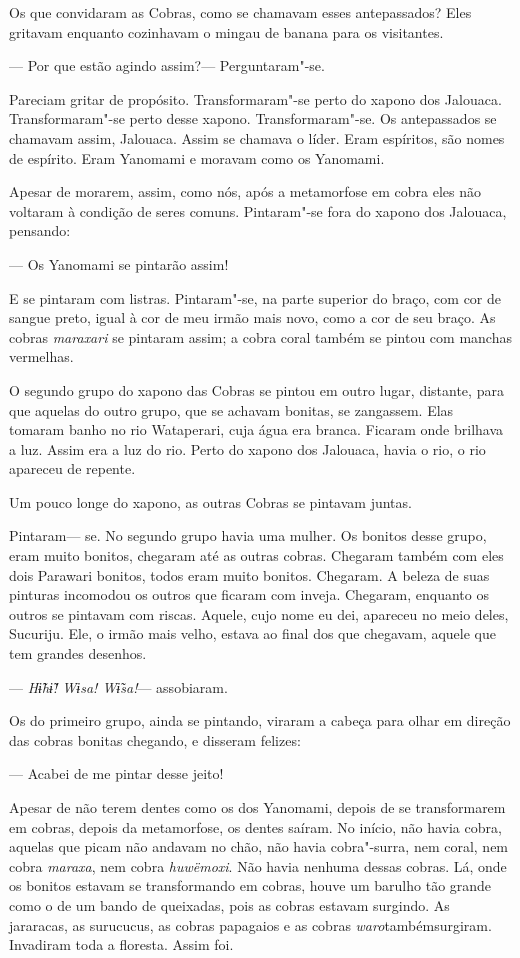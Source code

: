 Os que convidaram as Cobras, como se chamavam esses antepassados? Eles
gritavam enquanto cozinhavam o mingau de banana para os visitantes. 

--- Por que estão agindo assim?--- Perguntaram"-se.

Pareciam gritar de propósito. Transformaram"-se perto do xapono dos
Jalouaca. Transformaram"-se perto desse xapono. Transformaram"-se. Os
antepassados se chamavam assim, Jalouaca. Assim se chamava o líder. Eram
espíritos, são nomes de espírito. Eram Yanomami e moravam como os
Yanomami. 

Apesar de morarem, assim, como nós, após a metamorfose em cobra eles não
voltaram à condição de seres comuns. Pintaram"-se fora do xapono dos
Jalouaca, pensando: 

--- Os Yanomami se pintarão assim! 

E se pintaram com listras. Pintaram"-se, na parte superior do braço, com
cor de sangue preto, igual à cor de meu irmão mais novo, como a cor de
seu braço. As cobras \emph{maraxari} se pintaram assim; a cobra coral
também se pintou com manchas vermelhas. 

O segundo grupo do xapono das Cobras se pintou em outro lugar, distante,
para que aquelas do outro grupo, que se achavam bonitas, se zangassem.
Elas tomaram banho no rio Wataperari, cuja água era branca. Ficaram onde
brilhava a luz. Assim era a luz do rio. Perto do xapono dos Jalouaca,
havia o rio, o rio apareceu de repente. 

Um pouco longe do xapono, as outras Cobras se pintavam juntas. 

Pintaram--- se. No segundo grupo havia uma mulher. Os bonitos desse
grupo, eram muito bonitos, chegaram até as outras cobras. Chegaram
também com eles dois Parawari bonitos, todos eram muito bonitos.
Chegaram. A beleza de suas pinturas incomodou os outros que ficaram com
inveja. Chegaram, enquanto os outros se pintavam com riscas. Aquele,
cujo nome eu dei, apareceu no meio deles, Sucuriju. Ele, o irmão mais
velho, estava ao final dos que chegavam, aquele que tem grandes
desenhos.

--- \emph{Hɨ̃hɨ̃! Wɨsa! Wɨ̃sa!}--- assobiaram. 

Os do primeiro grupo, ainda se pintando, viraram a cabeça para olhar em
direção das cobras bonitas chegando, e disseram felizes:

--- Acabei de me pintar desse jeito! 

Apesar de não terem dentes como os dos Yanomami, depois de se
transformarem em cobras, depois da metamorfose, os dentes saíram. No
início, não havia cobra, aquelas que picam não andavam no chão, não
havia cobra"-surra, nem coral, nem cobra \emph{maraxa}, nem
cobra \emph{huwëmoxi}. Não havia nenhuma dessas cobras. Lá, onde os
bonitos estavam se transformando em cobras, houve um barulho tão grande
como o de um bando de queixadas, pois as cobras estavam surgindo. As
jararacas, as surucucus, as cobras papagaios e as
cobras \emph{waro}tambémsurgiram. Invadiram toda a floresta. Assim foi. 

